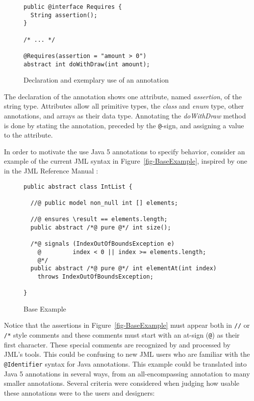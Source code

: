\documentclass{llncs}
\newcommand{\figref}[1]{Figure~\vref{#1}}
\begin{document}
\begin{figure}[ht]
\begin{lstlisting}[language={[JML]Java}]
public @interface Requires {
  String assertion();
}

/* ... */

@Requires(assertion = "amount > 0")
abstract int doWithDraw(int amount);
\end{lstlisting}
\caption{Declaration and exemplary use of an annotation}
\label{fig-AnnotationExample}
\end{figure}

The declaration of the annotation shows one attribute, named \textit{assertion}, of the string type. Attributes allow all primitive types, the \textit{class} and \textit{enum} type, other annotations, and arrays as their data type. Annotating the \textit{doWithDraw} method is done by stating the annotation, preceded by the \lstinline!@!-sign, and assigning a value to the attribute.

In order to motivate the use Java 5 annotations to specify behavior, consider an example of the current JML syntax in \figref{fig-BaseExample}, inspired by one in the JML Reference Manual \cite{Leavens-etal07}:

\begin{figure}[ht]
\begin{lstlisting}[language={[JML]Java}]
public abstract class IntList {

  //@ public model non_null int [] elements;

  //@ ensures \result == elements.length;
  public abstract /*@ pure @*/ int size();
        
  /*@ signals (IndexOutOfBoundsException e) 
    @         index < 0 || index >= elements.length;
    @*/
  public abstract /*@ pure @*/ int elementAt(int index) 
    throws IndexOutOfBoundsException;

}
\end{lstlisting}
\caption{Base Example}
\label{fig-BaseExample}
\end{figure}

Notice that the assertions in \figref{fig-BaseExample} must appear both in \lstinline!//! or \lstinline!/*! style comments and these comments must start with an at-sign (\lstinline!@!) as their first character.  These special comments are recognized by and processed by JML's tools.  This could be confusing to new JML users who are familiar with the \texttt{@Identifier} syntax for Java annotations.  This example could be translated into Java 5 annotations in several ways, from an all-encompassing annotation to many smaller annotations.  Several criteria were considered when judging how usable these annotations were to the users and designers:
\end{document}
